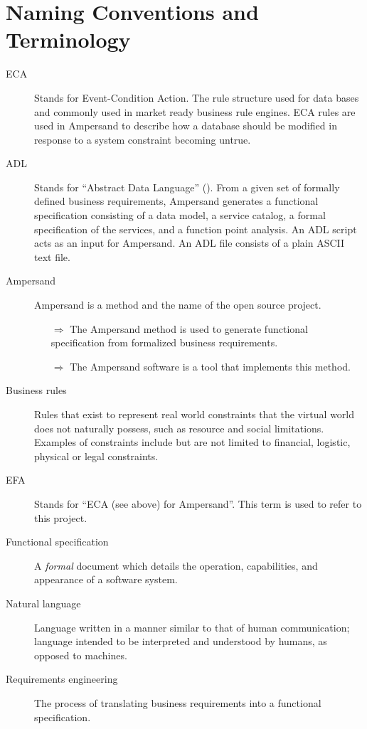 \documentclass[12pt]{report}
\begin{document}
\section{Naming Conventions and Terminology}\label{sec:Naming} 
\begin{description}
\item[ECA] Stands for Event-Condition Action. The rule structure used for data
  bases and commonly used in market ready business rule engines. ECA rules are
  used in Ampersand to describe how a database should be modified in response to
  a system constraint becoming untrue.
  
\item [ADL] Stands for ``Abstract Data Language'' (\cite[13]{derFun}). From a
given set of formally defined business requirements, Ampersand generates a
functional specification consisting of a data model, a service catalog, a
formal specification of the services, and a function point analysis. An ADL
script acts as an input for Ampersand. An ADL file consists of a plain ASCII
text file.
\item [Ampersand] Ampersand is a method and the name of the open source 
project. 
    \begin{itemize}
        \item[$\Rightarrow$] The Ampersand method is used to generate
        functional specification from formalized business requirements.
        \item[$\Rightarrow$] The Ampersand software is a tool that implements 
        this method.
    \end{itemize} 
    
\item [Business rules] Rules that exist to represent real world 
constraints that the virtual world does not naturally possess, such as resource 
and social limitations. Examples of constraints include but are not limited to 
financial, logistic, physical or legal constraints.

\item [EFA] Stands for ``ECA (see above) for Ampersand''. This term is used to 
refer to this project. 
\item [Functional specification] A \emph{formal} document which details the 
operation, capabilities, and appearance of a software system. 

\item [Natural language] Language written in a manner similar to that of human 
communication; 
  language intended to be interpreted and understood by humans, as opposed to 
  machines. 
  
\item [Requirements engineering] The process of translating business
requirements into a functional specification. 
\end{description}
\end{document}
